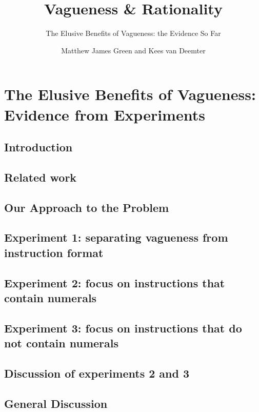 \documentclass[ %
  graybox       %
 ,envcountchap  %
 ,sectrefs      %
 ,footinfo      %
 ,graphics      %
]{svmono}
\begin{document}
\author{Matthew James Green and Kees van Deemter}
\title{Vagueness \& Rationality}
\subtitle{The Elusive Benefits of Vagueness: the Evidence So Far}
\maketitle
\frontmatter
\tableofcontents
\mainmatter
\chapter{The Elusive Benefits of Vagueness: Evidence from Experiments}\label{chapterlabel}

\section{Introduction}\label{introduction}
\section{Related work}\label{related-work}
\section{Our Approach to the Problem}\label{our-approach-to-the-problem}
\section{Experiment 1: separating vagueness from instruction format}\label{e1}
\section{Experiment 2: focus on instructions that contain numerals}\label{e2}
\section{Experiment 3: focus on instructions that do not contain numerals}\label{e3}
\section{Discussion of experiments 2 and 3}\label{discussion-of-e2-and-e3}
\section{General Discussion}\label{general-discussion}
\backmatter


\backmatter
\end{document}
